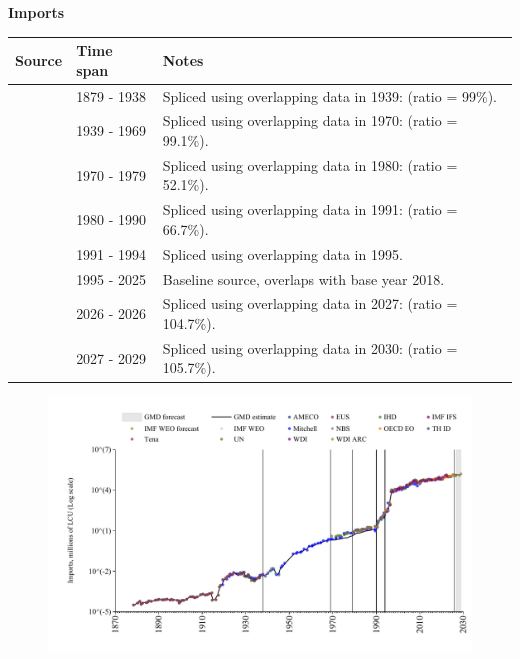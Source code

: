 \documentclass[12pt,a4paper,landscape]{article}
\begin{document}
\begin{adjustbox}{max totalsize={\paperwidth}{\paperheight},center}
\begin{minipage}[t][\textheight][t]{\textwidth}
\vspace*{0.5cm}
{}
\begin{center}
{\Large\bfseries Imports}
\end{center}
\vspace{0.5cm}
\begin{table}[H]
\centering
\small
\begin{tabular}{|l|l|l|}
\hline
\textbf{Source} & \textbf{Time span} & \textbf{Notes} \\
\hline
\rowcolor{white}\cite{Tena}& 1879 - 1938 &Spliced using overlapping data in 1939: (ratio = 99\%). \\
\rowcolor{lightgray}\cite{Mitchell}& 1939 - 1969 &Spliced using overlapping data in 1970: (ratio = 99.1\%). \\
\rowcolor{white}\cite{UN}& 1970 - 1979 &Spliced using overlapping data in 1980: (ratio = 52.1\%). \\
\rowcolor{lightgray}\cite{WDI}& 1980 - 1990 &Spliced using overlapping data in 1991: (ratio = 66.7\%). \\
\rowcolor{white}\cite{AMECO}& 1991 - 1994 &Spliced using overlapping data in 1995. \\
\rowcolor{lightgray}\cite{OECD_EO}& 1995 - 2025 &Baseline source, overlaps with base year 2018. \\
\rowcolor{white}\cite{AMECO}& 2026 - 2026 &Spliced using overlapping data in 2027: (ratio = 104.7\%). \\
\rowcolor{lightgray}\cite{IMF_WEO_forecast}& 2027 - 2029 &Spliced using overlapping data in 2030: (ratio = 105.7\%). \\
\hline
\end{tabular}
\end{table}
\begin{figure}[H]
\centering
\includegraphics[width=\textwidth,height=0.6\textheight,keepaspectratio]{graphs/BGR_imports.pdf}
\end{figure}
\end{minipage}
\end{adjustbox}
\end{document}
